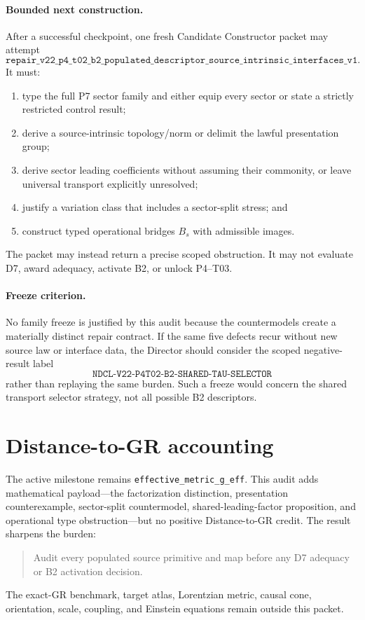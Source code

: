 \documentclass[11pt]{article}
\begin{document}
\paragraph{Bounded next construction.}
After a successful checkpoint, one fresh Candidate Constructor packet may
attempt
\[
 \texttt{repair\_v22\_p4\_t02\_b2\_populated\_descriptor\_source\_intrinsic\_interfaces\_v1}.
\]
It must:
\begin{enumerate}[label=(R\arabic*),leftmargin=2.5em]
  \item type the full P7 sector family and either equip every sector or state a
        strictly restricted control result;
  \item derive a source-intrinsic topology/norm or delimit the lawful
        presentation group;
  \item derive sector leading coefficients without assuming their commonity,
        or leave universal transport explicitly unresolved;
  \item justify a variation class that includes a sector-split stress; and
  \item construct typed operational bridges \(B_s\) with admissible images.
\end{enumerate}
The packet may instead return a precise scoped obstruction.  It may not
evaluate D7, award adequacy, activate B2, or unlock P4--T03.

\paragraph{Freeze criterion.}
No family freeze is justified by this audit because the countermodels create a
materially distinct repair contract.  If the same five defects recur without
new source law or interface data, the Director should consider the scoped
negative-result label
\[
 \texttt{NDCL-V22-P4T02-B2-SHARED-TAU-SELECTOR}
\]
rather than replaying the same burden.  Such a freeze would concern the shared
transport selector strategy, not all possible B2 descriptors.

\section{Distance-to-GR accounting}

The active milestone remains \texttt{effective\_metric\_g\_eff}.  This audit
adds mathematical payload---the factorization distinction, presentation
counterexample, sector-split countermodel, shared-leading-factor proposition,
and operational type obstruction---but no positive Distance-to-GR credit.
The result sharpens the burden:
\begin{quote}
Audit every populated source primitive and map before any D7 adequacy or B2
activation decision.
\end{quote}
The exact-GR benchmark, target atlas, Lorentzian metric, causal cone,
orientation, scale, coupling, and Einstein equations remain outside this
packet.
\end{document}
